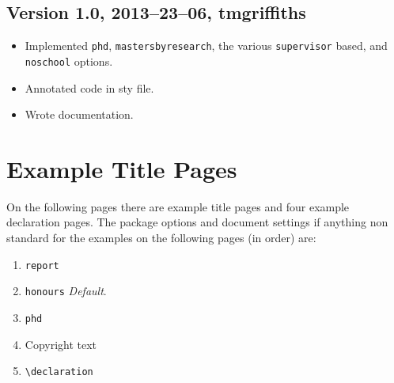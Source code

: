 \documentclass[12pt,oneside]{article}
\newcommand{\option}[1]{\texttt{\color{UOWblue}#1}}
\newcommand{\command}[1]{\texttt{\color{UOWred}#1}}
\begin{document}
\subsection*{Version 1.0, 2013–23–06, tmgriffiths}
\begin{itemize}
    \item Implemented \option{phd}, \option{mastersbyresearch}, the various \option{supervisor} based, and \option{noschool} options.
    \item Annotated code in sty file.
    \item Wrote documentation.
\end{itemize}

\section{Example Title Pages}
On the following pages there are example title pages and four example declaration pages. The package options and document settings if anything non standard for the examples on the following pages (in order) are:
\begin{enumerate}
    \item \option{report}
    \item \option{honours} \emph{Default}.
    \item \option{phd}
    \item Copyright text
    \item \command{\textbackslash{}declaration}
\end{enumerate}






\end{document}
